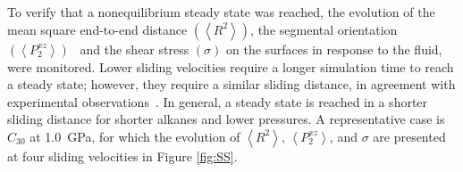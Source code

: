 \documentclass[5p]{elsarticle}
\begin{document}
To verify that a nonequilibrium steady state was reached, the evolution of the mean square end-to-end distance $\left(\left< R^2 \right> \right)$, the segmental orientation $\left(\left<P_{2}^{xz} \right> \right)$~\cite{Erman1985} and the shear stress $\left(\sigma \right)$ on the surfaces in response to the fluid, were monitored. Lower sliding velocities require a longer simulation time to reach a steady state; however, they require a similar sliding distance, in agreement with experimental observations~\cite{Drummond2000}. In general, a steady state is reached in a shorter sliding distance for shorter alkanes and lower pressures. A representative case is $C_{30}$ at \SI{1.0}{\giga\pascal}, for which the evolution of $\left< R^2 \right>$, $\left<P_{2}^{xz} \right>$, and $\sigma$ are presented at four sliding velocities in Figure \ref{fig:SS}.
 
\end{document}
